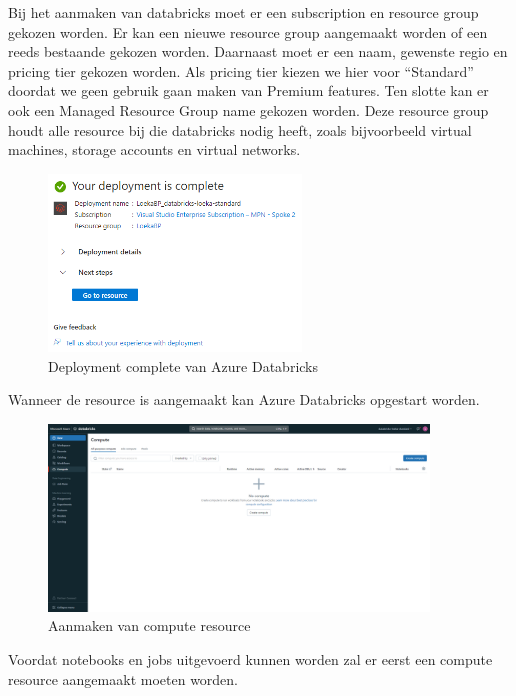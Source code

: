 Bij het aanmaken van databricks moet er een subscription en resource group gekozen worden. Er kan een nieuwe resource group aangemaakt worden of een reeds bestaande gekozen worden. Daarnaast moet er een naam, gewenste regio en pricing tier gekozen worden. Als pricing tier kiezen we hier voor ``Standard'' doordat we geen gebruik gaan maken van Premium features. Ten slotte kan er ook een Managed Resource Group name gekozen worden. Deze resource group houdt alle resource bij die databricks nodig heeft, zoals bijvoorbeeld virtual machines, storage accounts en virtual networks.

\begin{figure}[H]
    \centering
    \includegraphics[width=0.6\textwidth]{./graphics/databricks/initial_3.png}
    \caption{Deployment complete van Azure Databricks}
\end{figure}

Wanneer de resource is aangemaakt kan Azure Databricks opgestart worden.

\begin{figure}[H]
    \centering
    \includegraphics[width=0.9\textwidth]{./graphics/databricks/initial_4.png}
    \caption{Aanmaken van compute resource}
\end{figure}

Voordat notebooks en jobs uitgevoerd kunnen worden zal er eerst een compute resource aangemaakt moeten worden.

